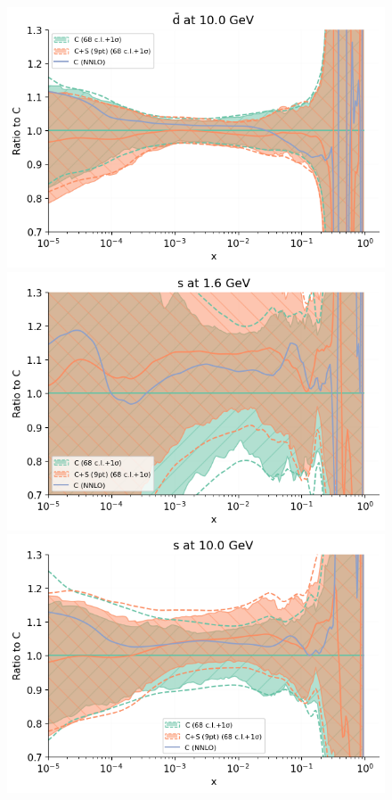 \begin{figure}[H]
\begin{center}
         \includegraphics[scale=0.45]{mhous/plots/jplots/pdfscalespecs0_basespecs0_pdfnormalize0_plot_pdfs_bard2.png}
    \includegraphics[scale=0.45]{mhous/plots/jplots/pdfscalespecs0_basespecs0_pdfnormalize0_plot_pdfs_s.png}
       \includegraphics[scale=0.45]{mhous/plots/jplots/pdfscalespecs0_basespecs0_pdfnormalize0_plot_pdfs_s2.png}


\end{center}
\end{figure}
